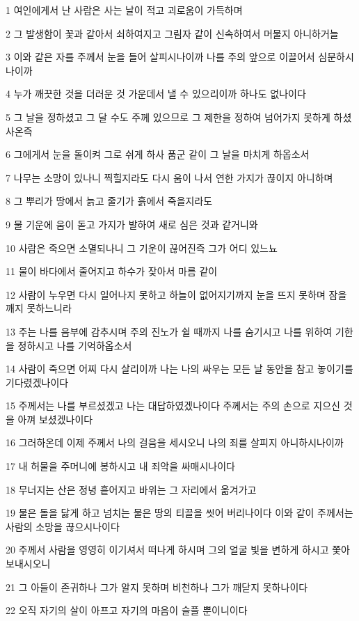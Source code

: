 \par 1 여인에게서 난 사람은 사는 날이 적고 괴로움이 가득하며
\par 2 그 발생함이 꽃과 같아서 쇠하여지고 그림자 같이 신속하여서 머물지 아니하거늘
\par 3 이와 같은 자를 주께서 눈을 들어 살피시나이까 나를 주의 앞으로 이끌어서 심문하시나이까
\par 4 누가 깨끗한 것을 더러운 것 가운데서 낼 수 있으리이까 하나도 없나이다
\par 5 그 날을 정하셨고 그 달 수도 주께 있으므로 그 제한을 정하여 넘어가지 못하게 하셨사온즉
\par 6 그에게서 눈을 돌이켜 그로 쉬게 하사 품군 같이 그 날을 마치게 하옵소서
\par 7 나무는 소망이 있나니 찍힐지라도 다시 움이 나서 연한 가지가 끊이지 아니하며
\par 8 그 뿌리가 땅에서 늙고 줄기가 흙에서 죽을지라도
\par 9 물 기운에 움이 돋고 가지가 발하여 새로 심은 것과 같거니와
\par 10 사람은 죽으면 소멸되나니 그 기운이 끊어진즉 그가 어디 있느뇨
\par 11 물이 바다에서 줄어지고 하수가 잦아서 마름 같이
\par 12 사람이 누우면 다시 일어나지 못하고 하늘이 없어지기까지 눈을 뜨지 못하며 잠을 깨지 못하느니라
\par 13 주는 나를 음부에 감추시며 주의 진노가 쉴 때까지 나를 숨기시고 나를 위하여 기한을 정하시고 나를 기억하옵소서
\par 14 사람이 죽으면 어찌 다시 살리이까 나는 나의 싸우는 모든 날 동안을 참고 놓이기를 기다렸겠나이다
\par 15 주께서는 나를 부르셨겠고 나는 대답하였겠나이다 주께서는 주의 손으로 지으신 것을 아껴 보셨겠나이다
\par 16 그러하온데 이제 주께서 나의 걸음을 세시오니 나의 죄를 살피지 아니하시나이까
\par 17 내 허물을 주머니에 봉하시고 내 죄악을 싸매시나이다
\par 18 무너지는 산은 정녕 흩어지고 바위는 그 자리에서 옮겨가고
\par 19 물은 돌을 닳게 하고 넘치는 물은 땅의 티끌을 씻어 버리나이다 이와 같이 주께서는 사람의 소망을 끊으시나이다
\par 20 주께서 사람을 영영히 이기셔서 떠나게 하시며 그의 얼굴 빛을 변하게 하시고 쫓아 보내시오니
\par 21 그 아들이 존귀하나 그가 알지 못하며 비천하나 그가 깨닫지 못하나이다
\par 22 오직 자기의 살이 아프고 자기의 마음이 슬플 뿐이니이다


